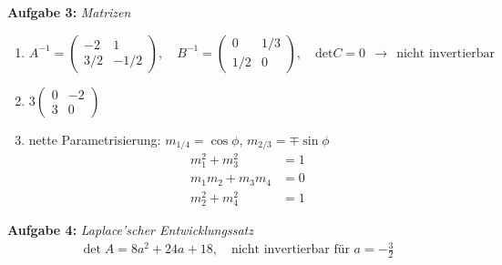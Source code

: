 \vspace{0.4cm}
%
\textbf{Aufgabe 3: } \emph{Matrizen}
\begin{enumerate}[label=(\alph*)]
\item ${A}^{-1} =\begin{pmatrix}-2 & 1\\ 3/2 & -1/2\end{pmatrix},\quad {B}^{-1}=\begin{pmatrix}0 & 1/3\\ 1/2 & 0\end{pmatrix},\quad \mathrm{det}C=0\ \ \rightarrow\ \ \text{nicht invertierbar}$
\item $3\begin{pmatrix}0 & -2\\ 3 & 0\end{pmatrix}$
\item nette Parametrisierung: $m_{1/4}=\cos\phi$, $m_{2/3}=\mp\sin\phi$
\begin{align*}
m_1^2+m_3^2&=1\\
m_1m_2+m_3m_4&=0\\
m_2^2+m_4^2&=1
\end{align*}
\end{enumerate}\vspace{0.4cm}
%
%
\textbf{Aufgabe 4: } \emph{Laplace'scher Entwicklungssatz}
\begin{align*}
\det A=8a^2+24a+18, \quad \text{nicht invertierbar für }a=-\frac{3}{2}
\end{align*}\\[0.5cm]
%

